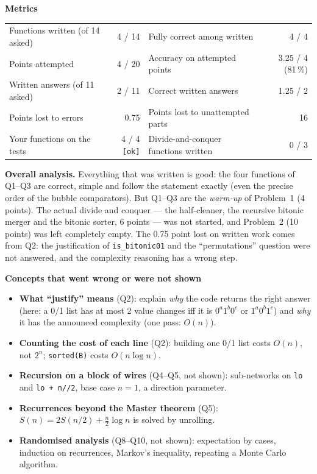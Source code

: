 \documentclass[11pt,a4paper]{article}
\begin{document}
\vspace{0.6em}
\textbf{Metrics}\\[0.2em]
\small
\begin{tabularx}{\linewidth}{@{}Xr@{\qquad}Xr@{}}
\toprule
Functions written (of 14 asked) & 4 / 14 & Fully correct among written & 4 / 4\\
Points attempted & 4 / 20 & Accuracy on attempted points & 3.25 / 4 (81\,\%)\\
Written answers (of 11 asked) & 2 / 11 & Correct written answers & 1.25 / 2\\
Points lost to errors & 0.75 & Points lost to unattempted parts & 16\\
Your functions on the tests & 4 / 4 \texttt{[ok]} & Divide-and-conquer functions written & 0 / 3\\
\bottomrule
\end{tabularx}
\normalsize

\vspace{0.5em}
\textbf{Overall analysis.} Everything that was written is good: the four functions of Q1--Q3 are
correct, simple and follow the statement exactly (even the precise order of the bubble
comparators). But Q1--Q3 are the \emph{warm-up} of Problem~1 (4 points). The actual divide and
conquer --- the half-cleaner, the recursive bitonic merger and the bitonic sorter, 6 points ---
was not started, and Problem~2 (10 points) was left completely empty. The 0.75 point lost on
written work comes from Q2: the justification of \texttt{is\_bitonic01} and the ``permutations''
question were not answered, and the complexity reasoning has a wrong step.

\textbf{Concepts that went wrong or were not shown}
\begin{itemize}[nosep,leftmargin=1.2em]
\item \textbf{What ``justify'' means} (Q2): explain \emph{why} the code returns the right answer
  (here: a 0/1 list has at most 2 value changes iff it is $0^a1^b0^c$ or $1^a0^b1^c$) and \emph{why}
  it has the announced complexity (one pass: $O(n)$).
\item \textbf{Counting the cost of each line} (Q2): building one 0/1 list costs $O(n)$, not $2^n$;
  \texttt{sorted(B)} costs $O(n\log n)$.
\item \textbf{Recursion on a block of wires} (Q4--Q5, not shown): sub-networks on
  \texttt{lo} and \texttt{lo + n//2}, base case $n=1$, a direction parameter.
\item \textbf{Recurrences beyond the Master theorem} (Q5): $S(n)=2S(n/2)+\tfrac n2\log n$ is solved
  by unrolling.
\item \textbf{Randomised analysis} (Q8--Q10, not shown): expectation by cases, induction on
  recurrences, Markov's inequality, repeating a Monte Carlo algorithm.
\end{itemize}
\end{document}
